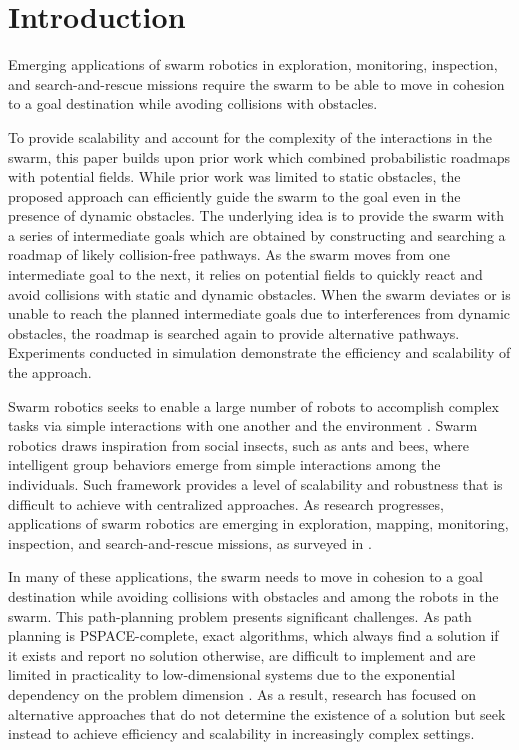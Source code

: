 \noindent




\section{Introduction}
\label{sec:Intro}


Emerging applications of swarm robotics in exploration, monitoring,
inspection, and search-and-rescue missions require the swarm to be
able to move in cohesion to a goal destination while avoding
collisions with obstacles.

To provide scalability and account for the
complexity of the interactions in the swarm, this paper builds upon
prior work which combined probabilistic roadmaps with potential
fields. While prior work was limited to static obstacles, the proposed
approach can efficiently guide the swarm to the goal even in the
presence of dynamic obstacles. The underlying idea is to provide the
swarm with a series of intermediate goals which are obtained by
constructing and searching a roadmap of likely collision-free
pathways. As the swarm moves from one intermediate goal to the next,
it relies on potential fields to quickly react and avoid collisions
with static and dynamic obstacles.  When the swarm deviates or is
unable to reach the planned intermediate goals due to interferences
from dynamic obstacles, the roadmap is searched again to provide
alternative pathways. Experiments conducted in simulation demonstrate
the efficiency and scalability of the approach.

Swarm robotics seeks to enable a large number of robots to accomplish
complex tasks via simple interactions with one another and the
environment \cite{reynolds1987flocks}.  Swarm robotics draws
inspiration from social insects, such as ants and bees, where
intelligent group behaviors emerge from simple interactions among the
individuals. Such framework provides a level of scalability and
robustness that is difficult to achieve with centralized
approaches. As research progresses, applications of swarm robotics are
emerging in exploration, mapping,
monitoring, inspection, and search-and-rescue missions, as surveyed in
\cite{swarm,swarmReview12}.

In many of these applications, the swarm needs to move in
cohesion to a goal destination while avoiding collisions with
obstacles and among the robots in the swarm. This path-planning
problem presents significant challenges. As path
planning is PSPACE-complete, exact algorithms, which always find a
solution if it exists and report no solution otherwise, are difficult
to implement and are limited in practicality to low-dimensional
systems due to the exponential dependency on the problem dimension
\cite{Rei79,Can88,SchSha88}.
As a result, research has focused on alternative approaches that do
not determine the existence of a solution but seek instead
to achieve efficiency and scalability in increasingly complex
settings.


